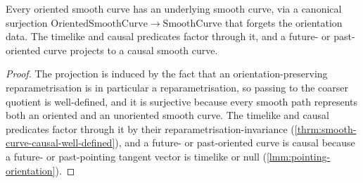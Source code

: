 \begin{theorem}
    \label{thrm:oriented-curve-projection}
    \leanok
    Every oriented smooth curve has an underlying smooth curve, via a canonical surjection $\mathrm{OrientedSmoothCurve} \to \mathrm{SmoothCurve}$ that forgets the orientation data. The timelike and causal predicates factor through it, and a future- or past-oriented curve projects to a causal smooth curve.
\end{theorem}
\begin{proof}
    \leanok
    The projection is induced by the fact that an orientation-preserving reparametrisation is in particular a reparametrisation, so passing to the coarser quotient is well-defined, and it is surjective because every smooth path represents both an oriented and an unoriented smooth curve. The timelike and causal predicates factor through it by their reparametrisation-invariance (\ref{thrm:smooth-curve-causal-well-defined}), and a future- or past-oriented curve is causal because a future- or past-pointing tangent vector is timelike or null (\ref{lmm:pointing-orientation}).
\end{proof}

